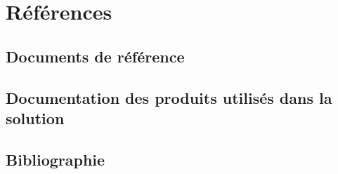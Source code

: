 \section{Références}
\subsection{Documents de référence}
\subsection{Documentation des produits utilisés dans la solution}
\subsection{Bibliographie}